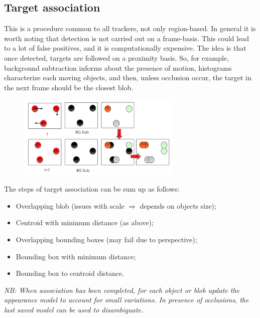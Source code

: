 \subsection{Target association}
This is a procedure common to all trackers, not only region-based. In general it is worth noting that detection is not carried out on a frame-basis.
This could lead to a lot of false positives, and it is computationally expensive.  
The idea is that once detected, targets are followed on a proximity basis. So, for example, background subtraction informs about the presence of motion, histograms characterize each moving objects, and then, unless occlusion occur, the target in the next frame should be the closest blob.
\begin{figure}[h]
\centering
\includegraphics[width=0.7\textwidth]{Figures/Target_association.png}
\end{figure}

The steps of target association can be sum up as follows:
\begin{itemize}
\item Overlapping blob (issues with scale $\Rightarrow$ depends on objects size);
\item Centroid with minimum distance (as above);
\item Overlapping bounding boxes (may fail due to perspective);
\item Bounding box with minimum distance;
\item Bounding box to centroid distance.
\end{itemize}

\textit{NB: When association has been completed, for each object or blob update the appearance model to account for small variations. In presence of occlusions, the last saved model can be used to disambiguate.}

